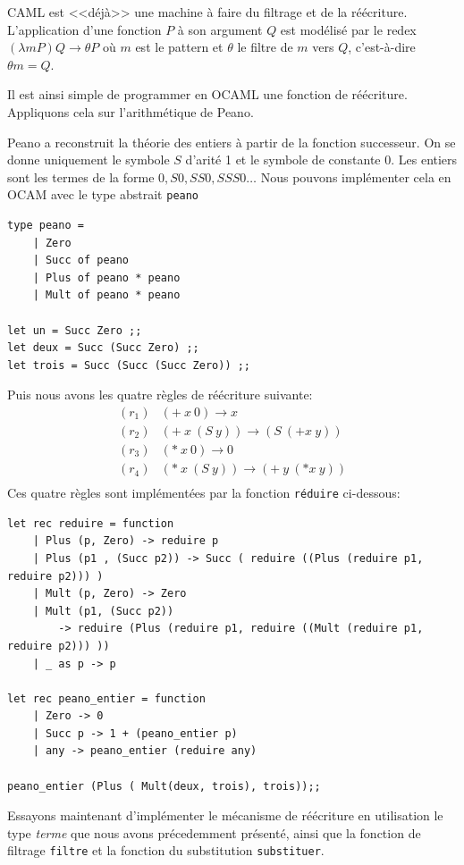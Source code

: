 \documentclass[11pt]{book}
\begin{document}
CAML est <<déjà>> une machine à faire du filtrage et de la réécriture. 
L'application d'une fonction $P$ à son argument $Q$ est modélisé par le redex
$(\lambda m P)Q \longrightarrow \theta P$ où $m$ est le pattern et $\theta$ le filtre de
$m$ vers $Q$, c'est-à-dire $\theta m = Q$.	


Il est ainsi simple de programmer en OCAML une fonction de réécriture.
Appliquons cela sur l'arithmétique de Peano.

Peano a reconstruit la théorie des
entiers à partir de la fonction successeur. On se donne uniquement le symbole
$S$ d'arité 1 et le symbole de constante 0.
Les entiers sont les termes de la forme $0, S0, SS0, SSS0 \ldots$
Nous pouvons implémenter cela en OCAM avec le type abstrait \verb+peano+
\begin{Verbatim}
type peano = 
	| Zero
	| Succ of peano
	| Plus of peano * peano
	| Mult of peano * peano

let un = Succ Zero ;;
let deux = Succ (Succ Zero) ;;
let trois = Succ (Succ (Succ Zero)) ;;
\end{Verbatim}

Puis nous avons les quatre règles de réécriture suivante:
$$
\begin{array}{ll}
(r_1) & (+\ x\ 0) \rightarrow x \\
(r_2) & (+\  x\ (S\ y)) \to (S\ (+x\ y)) \\
(r_3) & (*\ x\ 0) \to 0 \\
(r_4) & (*\ x\ (S\ y)) \to (+\ y\ (* x\ y)) \\
\end{array}
$$
Ces quatre règles sont implémentées par la fonction \verb+réduire+ ci-dessous:
\begin{Verbatim}
let rec reduire = function
	| Plus (p, Zero) -> reduire p
	| Plus (p1 , (Succ p2)) -> Succ ( reduire ((Plus (reduire p1, reduire p2))) )
	| Mult (p, Zero) -> Zero
	| Mult (p1, (Succ p2)) 
	    -> reduire (Plus (reduire p1, reduire ((Mult (reduire p1, reduire p2))) ))
	| _ as p -> p 

let rec peano_entier = function
	| Zero -> 0
	| Succ p -> 1 + (peano_entier p)
	| any -> peano_entier (reduire any)
	
peano_entier (Plus ( Mult(deux, trois), trois));;
\end{Verbatim}

Essayons maintenant d'implémenter le mécanisme de réécriture en utilisation le type 
\textit{terme} que nous avons précedemment présenté, ainsi que la fonction de filtrage \verb+filtre+ et 
la fonction du substitution \verb+substituer+.
\end{document}
